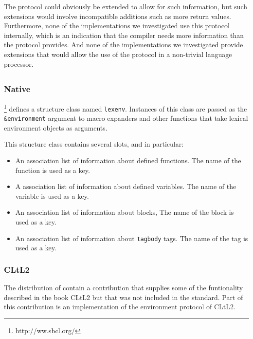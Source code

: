 The protocol could obviously be extended to allow for such
information, but such extensions would involve incompatible additions
such as more return values.  Furthermore, none of the \commonlisp{}
implementations we investigated use this protocol internally, which is
an indication that the compiler needs more information than the
protocol provides.  And none of the implementations we investigated
provide extensions that would allow the use of the protocol in
a non-trivial language processor.

\subsection{\sbcl{}}

\subsubsection{Native}

\sbcl{}%
\footnote{http://ww.sbcl.org/}
defines a structure class named \texttt{lexenv}.  Instances of
this class are passed as the \texttt{\&environment} argument to macro
expanders and other functions that take lexical environment objects as
arguments.

This structure class contains several slots, and in particular:
\begin{itemize}
\item An association list of information about defined functions.
  The name of the function is used as a key.
\item A association list of information about defined variables.
  The name of the variable is used as a key.
\item An association list of information about blocks,
  The name of the block is used as a key.
\item An association list of information about \texttt{tagbody} tags.
  The name of the tag is used as a key.
\end{itemize}

\subsubsection{CLtL2}

The distribution of \sbcl{} contain a contribution that supplies some
of the funtionality described in the book CLtL2 but that was not
included in the \commonlisp{} standard.  Part of this contribution is
an implementation of the environment protocol of CLtL2.

